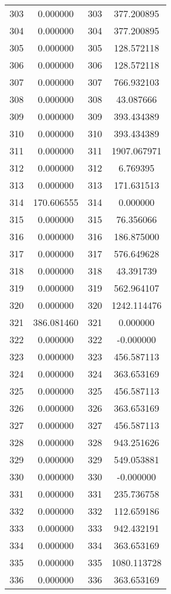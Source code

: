 \documentclass[12pt]{article}
\begin{document}
\begin{longtable}{@{}cccc@{}}
303 & 0.000000 & 303 & 377.200895 \\
304 & 0.000000 & 304 & 377.200895 \\
305 & 0.000000 & 305 & 128.572118 \\
306 & 0.000000 & 306 & 128.572118 \\
307 & 0.000000 & 307 & 766.932103 \\
308 & 0.000000 & 308 & 43.087666 \\
309 & 0.000000 & 309 & 393.434389 \\
310 & 0.000000 & 310 & 393.434389 \\
311 & 0.000000 & 311 & 1907.067971 \\
312 & 0.000000 & 312 & 6.769395 \\
313 & 0.000000 & 313 & 171.631513 \\
314 & 170.606555 & 314 & 0.000000 \\
315 & 0.000000 & 315 & 76.356066 \\
316 & 0.000000 & 316 & 186.875000 \\
317 & 0.000000 & 317 & 576.649628 \\
318 & 0.000000 & 318 & 43.391739 \\
319 & 0.000000 & 319 & 562.964107 \\
320 & 0.000000 & 320 & 1242.114476 \\
321 & 386.081460 & 321 & 0.000000 \\
322 & 0.000000 & 322 & -0.000000 \\
323 & 0.000000 & 323 & 456.587113 \\
324 & 0.000000 & 324 & 363.653169 \\
325 & 0.000000 & 325 & 456.587113 \\
326 & 0.000000 & 326 & 363.653169 \\
327 & 0.000000 & 327 & 456.587113 \\
328 & 0.000000 & 328 & 943.251626 \\
329 & 0.000000 & 329 & 549.053881 \\
330 & 0.000000 & 330 & -0.000000 \\
331 & 0.000000 & 331 & 235.736758 \\
332 & 0.000000 & 332 & 112.659186 \\
333 & 0.000000 & 333 & 942.432191 \\
334 & 0.000000 & 334 & 363.653169 \\
335 & 0.000000 & 335 & 1080.113728 \\
336 & 0.000000 & 336 & 363.653169 \\

\end{longtable}
\end{document}
